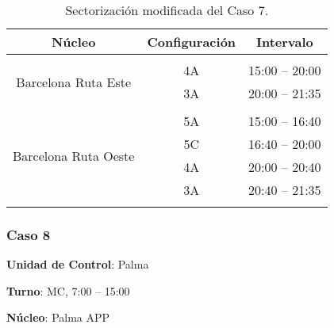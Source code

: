 \begin{table}[h]
	\centering
	\caption{Sectorización modificada del Caso 7.}
	\label{table:D:caso7-modif}
	\begin{tabular}{ccc}
		\hline
		\textbf{Núcleo}                                              & \textbf{Configuración} & \textbf{Intervalo} \\ \hline
		&                        &                    \\
		\multicolumn{1}{c|}{\multirow{2}{*}{Barcelona Ruta Este}}    & 4A                     & 15:00 -- 20:00     \\
		\multicolumn{1}{c|}{}                                        & 3A                     & 20:00 -- 21:35     \\
		&                        &                    \\
		\multicolumn{1}{c|}{\multirow{4}{*}{Barcelona Ruta   Oeste}} & 5A                     & 15:00 -- 16:40     \\
		\multicolumn{1}{c|}{}                                        & 5C                     & 16:40 -- 20:00     \\
		\multicolumn{1}{c|}{}                                        & 4A                     & 20:00 -- 20:40     \\
		\multicolumn{1}{c|}{}                                        & 3A                     & 20:40 -- 21:35     \\
		&                        &                    \\ \hline
	\end{tabular}
\end{table}


\subsubsection{Caso 8}

\textbf{Unidad de Control}: Palma

\textbf{Turno}: MC, 7:00 -- 15:00

\textbf{Núcleo}: Palma APP

